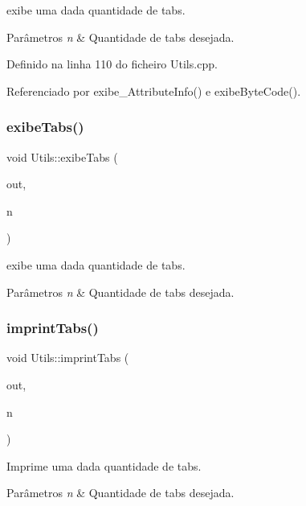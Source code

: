 exibe uma dada quantidade de tabs. 
\begin{DoxyParams}{Parâmetros}
{\em n} & Quantidade de tabs desejada. \\
\hline
\end{DoxyParams}


Definido na linha 110 do ficheiro Utils.\+cpp.



Referenciado por exibe\+\_\+\+Attribute\+Info() e exibe\+Byte\+Code().

\mbox{\label{classUtils_aebfca2747bb35554f74b1ad6abe7c2c3}} 
\subsubsection{\texorpdfstring{exibe\+Tabs()}{exibeTabs()}\hspace{0.1cm}{\footnotesize\ttfamily [2/2]}}
{\footnotesize\ttfamily void Utils\+::exibe\+Tabs (\begin{DoxyParamCaption}\item[{F\+I\+LE $\ast$}]{out,  }\item[{uint8\+\_\+t}]{n }\end{DoxyParamCaption})}

exibe uma dada quantidade de tabs. 
\begin{DoxyParams}{Parâmetros}
{\em n} & Quantidade de tabs desejada. \\
\hline
\end{DoxyParams}
\mbox{\label{classUtils_a932c28783170c6aa53362fbd0c4ceefa}} 
\subsubsection{\texorpdfstring{imprint\+Tabs()}{imprintTabs()}}
{\footnotesize\ttfamily void Utils\+::imprint\+Tabs (\begin{DoxyParamCaption}\item[{F\+I\+LE $\ast$}]{out,  }\item[{uint8\+\_\+t}]{n }\end{DoxyParamCaption})\hspace{0.3cm}{\ttfamily [static]}}

Imprime uma dada quantidade de tabs. 
\begin{DoxyParams}{Parâmetros}
{\em n} & Quantidade de tabs desejada. \\
\hline
\end{DoxyParams}


